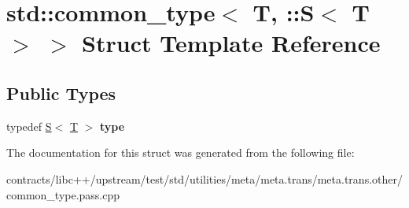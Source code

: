 \hypertarget{structstd_1_1common__type_3_01_t_00_01_1_1_s_3_01_t_01_4_01_4}{}\section{std\+:\+:common\+\_\+type$<$ T, \+:\+:S$<$ T $>$ $>$ Struct Template Reference}
\label{structstd_1_1common__type_3_01_t_00_01_1_1_s_3_01_t_01_4_01_4}
\subsection*{Public Types}
\begin{DoxyCompactItemize}
\item 
\mbox{\label{structstd_1_1common__type_3_01_t_00_01_1_1_s_3_01_t_01_4_01_4_a974be3e690eee51d203f01334c13a83d}} 
typedef \mbox{\hyperlink{struct_s}{S}}$<$ \mbox{\hyperlink{struct_t}{T}} $>$ {\bfseries type}
\end{DoxyCompactItemize}


The documentation for this struct was generated from the following file\+:\begin{DoxyCompactItemize}
\item 
contracts/libc++/upstream/test/std/utilities/meta/meta.\+trans/meta.\+trans.\+other/common\+\_\+type.\+pass.\+cpp\end{DoxyCompactItemize}
